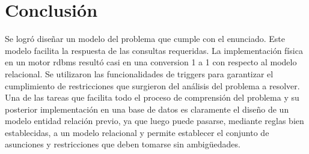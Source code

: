 \section{Conclusión}

Se logró diseñar un modelo del problema que cumple con el enunciado.  
Este modelo facilita la respuesta de las consultas requeridas. 
La implementación física en un motor rdbms resultó casi en una conversion 1 a 1 con respecto al modelo relacional. Se utilizaron las funcionalidades de triggers para garantizar el cumplimiento de restricciones que surgieron del análisis del problema a resolver.
Una de las tareas que facilita todo el proceso de comprensión del problema y su posterior implementación en una base de datos es claramente el diseño de un modelo entidad relación previo, ya que luego puede pasarse, mediante reglas bien establecidas, a un modelo relacional y permite establecer el conjunto de asunciones y restricciones que deben tomarse sin ambigüedades.
